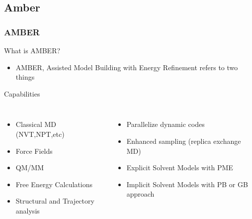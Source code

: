 \documentclass[slidestop,mathserif,compress,xcolor=svgnames]{beamer}
\begin{document}
\subsection{Amber}
\begin{frame}
  \frametitle{\small AMBER}
  \begin{block}{What is AMBER?}
    \begin{itemize}
      \item AMBER, Assisted Model Building with Energy Refinement refers to two things
    \end{itemize}
  \end{block}
  \begin{block}{Capabilities}
    {\scriptsize
    \begin{columns}
      \begin{itemize}
	\item Classical MD (NVT,NPT,etc)
	\item Force Fields
	\item QM/MM
	\item Free Energy Calculations
	\item Structural and Trajectory analysis
      \end{itemize}
      \begin{itemize}
	\item Parallelize dynamic codes
	\item Enhanced sampling (replica exchange MD)
	\item Explicit Solvent Models with PME
	\item Implicit Solvent Models with PB or GB approach
      \end{itemize}
    \end{columns}
    }
  \end{block}
\end{frame}
\end{document}
